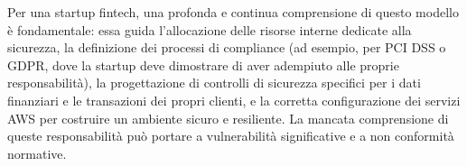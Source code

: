 Per una startup fintech, una profonda e continua comprensione di questo modello è fondamentale: essa guida l'allocazione delle risorse interne dedicate alla sicurezza, la definizione dei processi di compliance (ad esempio, per PCI DSS o GDPR, dove la startup deve dimostrare di aver adempiuto alle proprie responsabilità), la progettazione di controlli di sicurezza specifici per i dati finanziari e le transazioni dei propri clienti, e la corretta configurazione dei servizi AWS per costruire un ambiente sicuro e resiliente. La mancata comprensione di queste responsabilità può portare a vulnerabilità significative e a non conformità normative.